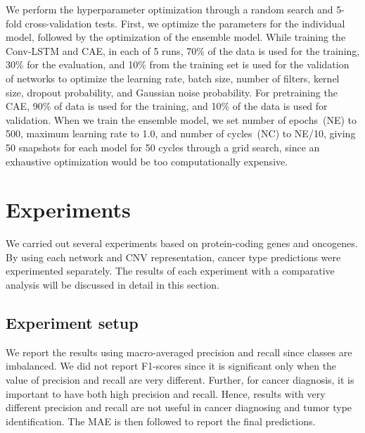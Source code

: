 \hspace*{3.5mm} We perform the hyperparameter optimization through a random search and 5-fold cross-validation tests. First, we optimize the parameters for the individual model, followed by the optimization of the ensemble model. While training the Conv-LSTM and CAE, in each of 5 runs, 70\% of the data is used for the training, 30\% for the evaluation, and 10\% from the training set is used for the validation of networks to optimize the learning rate, batch size, number of filters, kernel size, dropout probability, and Gaussian noise probability. For pretraining the CAE, 90\% of data is used for the training, and 10\% of the data is used for validation. When we train the ensemble model, we set number of epochs~(NE) to 500, maximum learning rate to 1.0, and number of cycles~(NC) to NE/10, giving 50 snapshots for each model for 50 cycles through a grid search, since an exhaustive optimization would be too computationally expensive. %

\section{Experiments}\label{chapter_3:results}
We carried out several experiments based on protein-coding genes and oncogenes. By using each network and CNV representation, cancer type predictions were experimented separately. The results of each experiment with a comparative analysis will be discussed in detail in this section. 

\subsection{Experiment setup}
We report the results using macro-averaged precision and recall since classes are imbalanced. We did not report F1-scores since it is significant only when the value of precision and recall are very different. Further, for cancer diagnosis, it is important to have both high precision and recall. Hence, results with very different precision and recall are not useful in cancer diagnosing and tumor type identification. The MAE is then followed to report the final predictions. 

